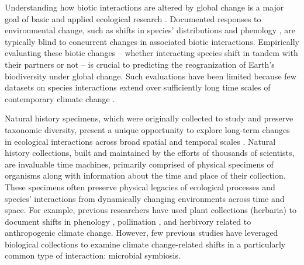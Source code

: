 \documentclass[11pt]{article}
\let\cite\citep
\begin{document}
Understanding how biotic interactions are altered by global change is a major goal of basic and applied ecological research \cite{gilman2010framework,blois2013climate}.
Documented responses to environmental change, such as shifts in species' distributions \cite{aitken2008adaptation} and phenology \cite{piao2019plant}, are typically blind to concurrent changes in associated biotic interactions.
Empirically evaluating these biotic changes -- whether interacting species shift in tandem with their partners or not \cite{hillerislambers2013will} -- is crucial to predicting the reogranization of Earth's biodiversity under global change. 
Such evaluations have been limited because few datasets on species interactions extend over sufficiently long time scales of contemporary climate change \cite{poisot2021global}.

Natural history specimens, which were originally collected to study and preserve taxonomic diversity, present a unique opportunity to explore long-term changes in ecological interactions across broad spatial and temporal scales \citep{meineke2018unrealized}. 
Natural history collections, built and maintained by the efforts of thousands of scientists, are invaluable time machines, primarily comprised of physical specimens of organisms along with information about the time and place of their collection. 
These specimens often preserve physical legacies of ecological processes and species' interactions from dynamically changing environments across time and space.
For example, previous researchers have used plant collections (herbaria) to document shifts in phenology \citep{willis2017old, park2019herbarium,  berg2019examination}, pollination \citep{pauw2011reconstruction, duan2019century}, and herbivory \citep{meineke2019herbarium} related to anthropogenic climate change. 
However, few previous studies have leveraged biological collections to examine climate change-related shifts in a particularly common type of interaction: microbial symbiosis.
\end{document}
